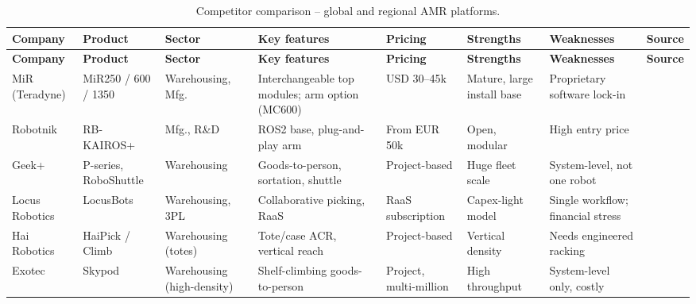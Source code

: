 {\footnotesize
\setlength{\tabcolsep}{3pt}
\renewcommand{\arraystretch}{1.3}
\begin{longtable}{|>{\raggedright\arraybackslash}m{1.7cm}|
                  >{\raggedright\arraybackslash}m{1.6cm}|
                  >{\raggedright\arraybackslash}m{2.0cm}|
                  >{\raggedright\arraybackslash}m{2.5cm}|
                  >{\raggedright\arraybackslash}m{1.7cm}|
                  >{\raggedright\arraybackslash}m{1.8cm}|
                  >{\raggedright\arraybackslash}m{2.2cm}|
                  >{\centering\arraybackslash}m{1.4cm}|}
\caption{Competitor comparison -- global and regional AMR platforms.}\label{tab:competitors}\\
\hline
\rowcolor{gray!15}
\textbf{Company} & \textbf{Product} & \textbf{Sector} & \textbf{Key features} & \textbf{Pricing} & \textbf{Strengths} & \textbf{Weaknesses} & \textbf{Source} \\
\hline
\endfirsthead
\hline
\rowcolor{gray!15}
\textbf{Company} & \textbf{Product} & \textbf{Sector} & \textbf{Key features} & \textbf{Pricing} & \textbf{Strengths} & \textbf{Weaknesses} & \textbf{Source} \\
\hline
\endhead
\hline
\endfoot
MiR (Teradyne) & MiR250 / 600 / 1350 & Warehousing, Mfg. & Interchangeable top modules; arm option (MC600) & USD 30--45k & Mature, large install base & Proprietary software lock-in & \cite{mir250} \\
\hline
Robotnik & RB-KAIROS+ & Mfg., R\&D & ROS2 base, plug-and-play arm & From EUR 50k & Open, modular & High entry price & \cite{robotnik_kairos} \\
\hline
Geek+ & P-series, RoboShuttle & Warehousing & Goods-to-person, sortation, shuttle & Project-based & Huge fleet scale & System-level, not one robot & \cite{fdatabot_amr2026} \\
\hline
Locus Robotics & LocusBots & Warehousing, 3PL & Collaborative picking, RaaS & RaaS subscription & Capex-light model & Single workflow; financial stress & \cite{standardbots_amr,builtin_raas} \\
\hline
Hai Robotics & HaiPick / Climb & Warehousing (totes) & Tote/case ACR, vertical reach & Project-based & Vertical density & Needs engineered racking & \cite{standardbots_amr} \\
\hline
Exotec & Skypod & Warehousing (high-density) & Shelf-climbing goods-to-person & Project, multi-million & High throughput & System-level only, costly & \cite{fdatabot_amr2026} \\

\end{longtable}}
